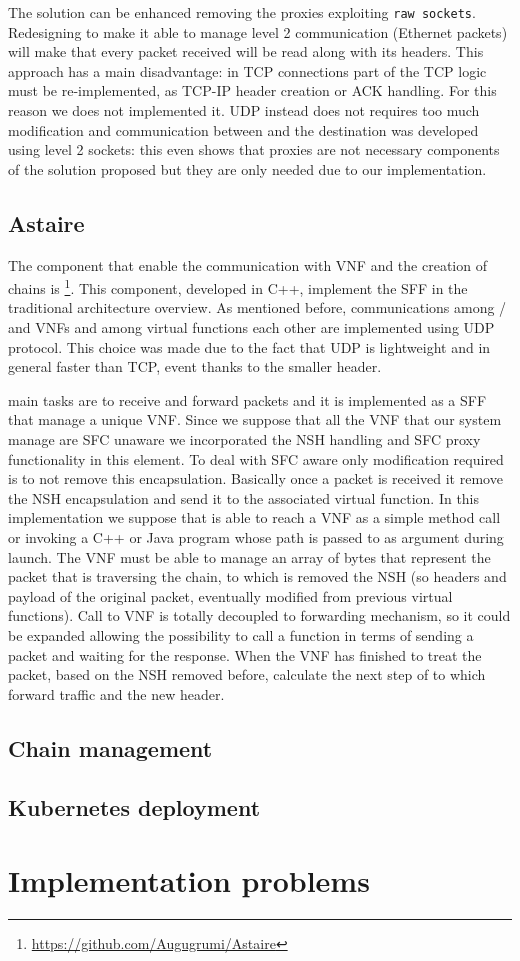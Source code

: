 The solution can be enhanced removing the proxies exploiting
\texttt{raw sockets}. Redesigning \ironhide{} to make it able to manage level 2
communication (Ethernet packets) will make that every packet received will
be read along with its headers. This approach has a main disadvantage: in TCP
connections part of the TCP logic must be re-implemented, as TCP-IP header
creation or ACK handling. For this reason we does not implemented it. UDP
instead does not requires too much modification and communication between 
\egress{} and the destination was developed using level 2 sockets: this even
shows that proxies are not necessary components of the solution proposed but
they are only needed due to our implementation.

\subsection{Astaire}
The component that enable the communication with VNF and the creation of chains
is \astaire{}\footnote{\url{https://github.com/Augugrumi/Astaire}}. This
component, developed in C++, implement the SFF in the traditional architecture
overview. As mentioned before, communications among \ingresses{}/\egresses{}
and VNFs and among virtual functions each other are implemented using UDP
protocol. This choice was made due to the fact that UDP is lightweight and in
general faster than TCP, event thanks to the smaller header. 

\astaire{} main tasks are to receive and forward packets and it is implemented
as a SFF that manage a unique VNF. Since we suppose that all the VNF that our
system manage are SFC unaware we incorporated the NSH handling and SFC proxy
functionality in this element. To deal with SFC aware only modification required
is to not remove this encapsulation. Basically once a packet is received it
remove the NSH encapsulation and send it to the associated virtual function. In
this implementation we suppose that \astaire{} is able to reach a VNF as a
simple method call or invoking a C++ or Java program whose path is passed to 
\astaire{} as argument during launch. The VNF must be able to manage an array of
bytes that represent the packet that is traversing the chain, to which is
removed the NSH (so headers and payload of the original packet, eventually
modified from previous virtual functions). Call to VNF is totally decoupled
to forwarding mechanism, so it could be expanded allowing the possibility to
call a function in terms of sending a packet and waiting for the response. When
the VNF has finished to treat the packet, based on the NSH removed before,
calculate the next step of to which forward traffic and the new header. 


\subsection{Chain management}


\subsection{Kubernetes deployment}

\section{Implementation problems}